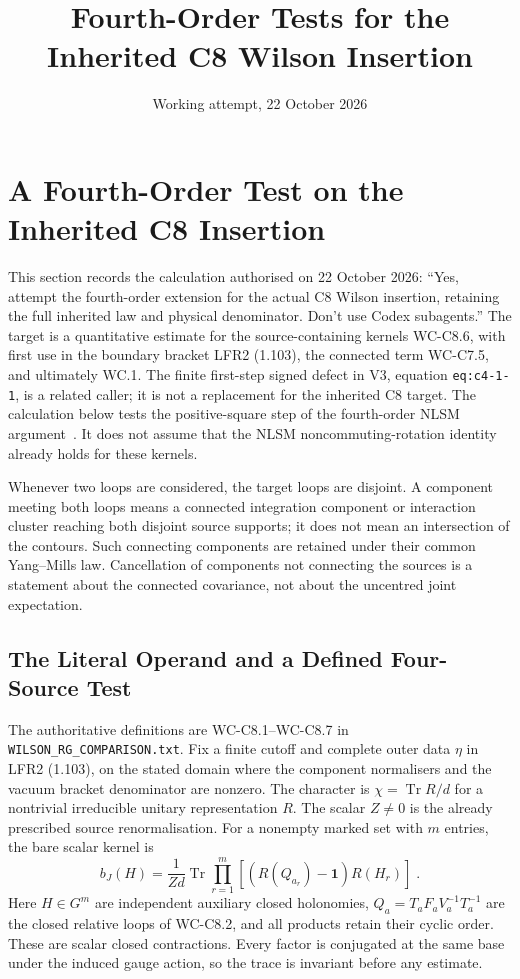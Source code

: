 \documentclass[11pt]{article}
\title{Fourth-Order Tests for the Inherited C8 Wilson Insertion}
\author{}
\date{Working attempt, 22 October 2026}
\newcommand{\id}{\mathbf 1}
\begin{document}
\maketitle

\section{A Fourth-Order Test on the Inherited C8 Insertion}
\label{sec:c8-fourth-test}

This section records the calculation authorised on 22 October 2026:
``Yes, attempt the fourth-order extension for the actual C8 Wilson
insertion, retaining the full inherited law and physical denominator.
Don't use Codex subagents.'' The target is a quantitative estimate for
the source-containing kernels WC-C8.6, with first use in the boundary
bracket LFR2 (1.103), the connected term WC-C7.5, and ultimately WC.1.
The finite first-step signed defect in V3, equation
\texttt{eq:c4-1-1}, is a related caller; it is not a replacement for
the inherited C8 target. The calculation below tests the positive-square
step of the fourth-order NLSM argument~\cite{OpenAIRotation}. It does not assume that the
NLSM noncommuting-rotation identity already holds for these kernels.

Whenever two loops are considered, the target loops are disjoint.
A component meeting both loops means a connected integration
component or interaction cluster reaching both disjoint source
supports; it does not mean an intersection of the contours.
Such connecting components are retained under their common
Yang--Mills law. Cancellation of components not connecting the
sources is a statement about the connected covariance, not
about the uncentred joint expectation.

\subsection{The Literal Operand and a Defined Four-Source Test}

The authoritative definitions are WC-C8.1--WC-C8.7 in
\texttt{WILSON\_RG\_COMPARISON.txt}. Fix a finite cutoff and complete
outer data $\eta$ in LFR2 (1.103), on the stated domain where the
component normalisers and the vacuum bracket denominator are nonzero.
The character is $\chi=\operatorname{Tr}R/d$ for a nontrivial irreducible
unitary representation $R$. The scalar $Z\neq 0$ is the already prescribed
source renormalisation. For a nonempty marked set with $m$ entries,
the bare scalar kernel is
\begin{equation}\label{eq:c8-fourth-bare}
    b_J(H)=\frac{1}{Zd}\operatorname{Tr}
        \prod_{r=1}^{m}\left[(R(Q_{a_r})-\id)R(H_r)\right]\;.
\end{equation}
Here $H\in G^m$ are independent auxiliary closed holonomies,
$Q_a=T_aF_aV_a^{-1}T_a^{-1}$ are the closed relative loops of WC-C8.2,
and all products retain their cyclic order. These are scalar closed
contractions. Every factor is conjugated at the same base under the
induced gauge action, so the trace is invariant before any estimate.
\end{document}
